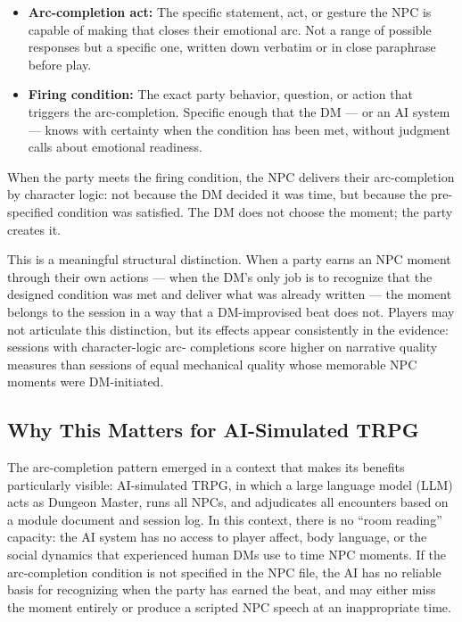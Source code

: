 \begin{itemize}
  \item \textbf{Arc-completion act:} The specific statement, act, or
    gesture the NPC is capable of making that closes their emotional arc.
    Not a range of possible responses but a specific one, written down
    verbatim or in close paraphrase before play.

  \item \textbf{Firing condition:} The exact party behavior, question,
    or action that triggers the arc-completion. Specific enough that the
    DM --- or an AI system --- knows with certainty when the condition
    has been met, without judgment calls about emotional readiness.
\end{itemize}

When the party meets the firing condition, the NPC delivers their
arc-completion by character logic: not because the DM decided it was
time, but because the pre-specified condition was satisfied. The DM
does not choose the moment; the party creates it.

This is a meaningful structural distinction. When a party earns an NPC
moment through their own actions --- when the DM's only job is to
recognize that the designed condition was met and deliver what was already
written --- the moment belongs to the session in a way that a DM-improvised
beat does not. Players may not articulate this distinction, but its effects
appear consistently in the evidence: sessions with character-logic arc-
completions score higher on narrative quality measures than sessions of
equal mechanical quality whose memorable NPC moments were DM-initiated.

\subsection{Why This Matters for AI-Simulated TRPG}

The arc-completion pattern emerged in a context that makes its benefits
particularly visible: AI-simulated TRPG, in which a large language model
(LLM) acts as Dungeon Master, runs all NPCs, and adjudicates all encounters
based on a module document and session log. In this context, there is no
``room reading'' capacity: the AI system has no access to player affect,
body language, or the social dynamics that experienced human DMs use to
time NPC moments. If the arc-completion condition is not specified in the
NPC file, the AI has no reliable basis for recognizing when the party has
earned the beat, and may either miss the moment entirely or produce a
scripted NPC speech at an inappropriate time.

